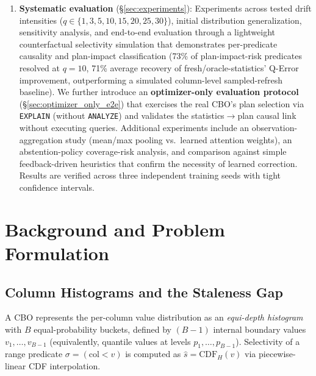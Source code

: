 \documentclass[runningheads]{llncs}
\begin{document}
\begin{enumerate}
  \item \textbf{Systematic evaluation} (\S\ref{sec:experiments}):
        Experiments across tested drift intensities
        ($q\in\{1,3,5,10,15,20,25,30\}$), initial distribution generalization,
        sensitivity analysis, and end-to-end evaluation through a
        lightweight counterfactual selectivity simulation that demonstrates
        per-predicate causality and plan-impact classification (73\%
        of plan-impact-risk predicates resolved at $q{=}10$, 71\% average recovery of
        fresh/oracle-statistics' Q-Error improvement, outperforming a simulated
        column-level sampled-refresh baseline).
        We further introduce an \textbf{optimizer-only evaluation protocol}
        (\S\ref{sec:optimizer_only_e2e}) that exercises the real CBO's plan
        selection via \texttt{EXPLAIN} (without \texttt{ANALYZE}) and
        validates the statistics$\rightarrow$plan causal link without
        executing queries.
        Additional experiments include an observation-aggregation study (mean/max
        pooling vs.\ learned attention weights), an abstention-policy
        coverage-risk analysis,
        and comparison against simple feedback-driven heuristics that confirm
        the necessity of learned correction.
        Results are verified across three independent training seeds with
        tight confidence intervals.
\end{enumerate}



\section{Background and Problem Formulation}
\label{sec:background}
\subsection{Column Histograms and the Staleness Gap}

A CBO represents the per-column value distribution as an \emph{equi-depth
histogram} with $B$ equal-probability buckets, defined by $(B-1)$ internal
boundary values $v_1,\ldots,v_{B-1}$ (equivalently, quantile values at levels
$p_1,\ldots,p_{B-1}$).
Selectivity of a range predicate $\sigma=(\text{col} < v)$ is computed as
$\hat{s} = \mathrm{CDF}_{H}(v)$ via piecewise-linear CDF interpolation.
\end{document}
